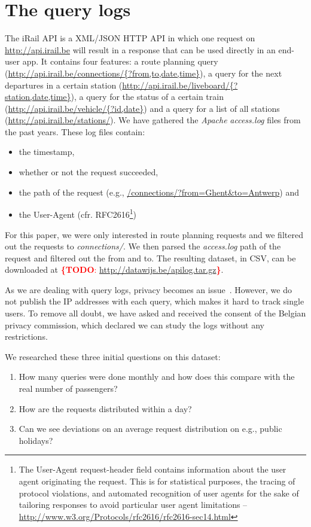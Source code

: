 \documentclass{sig-alternate}
\newcommand{\todo}[1]{\noindent\textcolor{red}{{\bf \{TODO}: #1{\bf \}}}}
\begin{document}
\section{The query logs}
\label{sec:logs}

The iRail API is a XML/JSON HTTP API in which one request on \url{http://api.irail.be} will result in a response that can be used directly in an end-user app.
It contains four features: a route planning query (\url{http://api.irail.be/connections/{?from,to,date,time}}), a query for the next departures in a certain station (\url{http://api.irail.be/liveboard/{?station,date,time}}), a query for the status of a certain train (\url{http://api.irail.be/vehicle/{?id,date}}) and a query for a list of all stations (\url{http://api.irail.be/stations/}).
We have gathered the \emph{Apache} \emph{access.log} files from the past years. 
These log files contain:
\begin{itemize}
  \item the timestamp,
  \item whether or not the request succeeded,
  \item the path of the request (e.g., \url{/connections/?from=Ghent\&to=Antwerp}) and
  \item the User-Agent (cfr. RFC2616\footnote{The User-Agent request-header field contains information about the user agent originating the request. This is for statistical purposes, the tracing of protocol violations, and automated recognition of user agents for the sake of tailoring responses to avoid particular user agent limitations -- \url{http://www.w3.org/Protocols/rfc2616/rfc2616-sec14.html}})
\end{itemize}

For this paper, we were only interested in route planning requests and we filtered out the requests to \emph{connections/}.
We then parsed the \emph{access.log} path of the request and filtered out the from and to. 
The resulting dataset, in CSV, can be downloaded at \todo{\url{http://datawijs.be/apilog.tar.gz}}.

As we are dealing with query logs, privacy becomes an issue~\cite{silvestri}.
However, we do not publish the IP addresses with each query, which makes it hard to track single users.
To remove all doubt, we have asked and received the consent of the Belgian privacy commission, which declared we can study the logs without any restrictions.

We researched these three initial questions on this dataset:
\begin{enumerate}
  \item How many queries were done monthly and how does this compare with the real number of passengers?
  \item How are the requests distributed within a day?
  \item Can we see deviations on an average request distribution on e.g., public holidays?
\end{enumerate}
\end{document}
